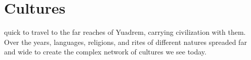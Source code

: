 \section{Cultures} \label{sec::cultures}

quick to travel to the far reaches of Yuadrem, carrying civilization with them.
Over the years, languages, religions, and rites of different natures spreaded far and wide to create the complex network of cultures we see today.




